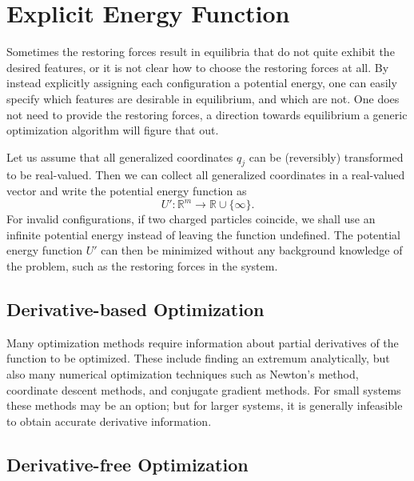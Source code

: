 \section{Explicit Energy Function}
\label{sect:explicit-energy-function}

Sometimes the restoring forces result in equilibria that do not quite exhibit the desired features, or it is not clear how to choose the restoring forces at all. By instead explicitly assigning each configuration a potential energy, one can easily specify which features are desirable in equilibrium, and which are not. One does not need to provide the restoring forces, \ie{} a direction towards equilibrium \emdash a generic optimization algorithm will figure that out.

Let us assume that all generalized coordinates ${q_j}$ can be (reversibly) transformed to be real-valued. Then we can collect all generalized coordinates in a real-valued vector and write the potential energy function as
%
\begin{equation*}
  U' \colon \mathbb{R}^m \to \mathbb{R} \cup \lbrace \infty \rbrace.
\end{equation*}
%
For invalid configurations, \eg{} if two charged particles coincide, we shall use an infinite potential energy instead of leaving the function undefined. The potential energy function ${U'}$ can then be minimized without any background knowledge of the problem, such as the restoring forces in the system.





\subsection{Derivative-based Optimization}

Many optimization methods require information about partial derivatives of the function to be optimized. These include finding an extremum analytically, but also many numerical optimization techniques such as Newton's method, coordinate descent methods, and conjugate gradient methods. For small systems these methods may be an option; but for larger systems, it is generally infeasible to obtain accurate derivative information.





\subsection{Derivative-free Optimization}

